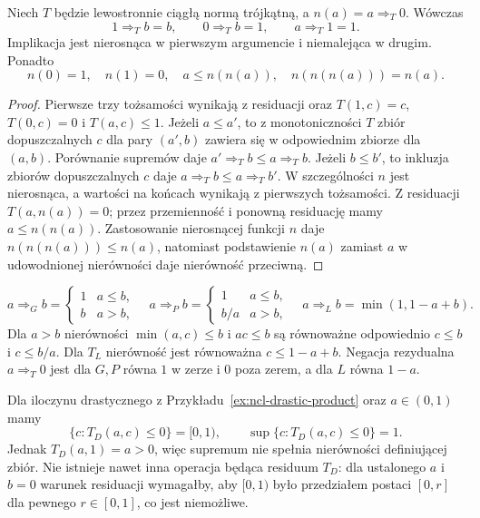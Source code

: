 \begin{lemat}
\label{lem:ncl-residuum-negation}
Niech $T$ będzie lewostronnie ciągłą normą trójkątną,
a $n(a)=a\Rightarrow_T0$. Wówczas
\[
 1\Rightarrow_T b=b,\qquad
 0\Rightarrow_T b=1,\qquad
 a\Rightarrow_T1=1.
\]
Implikacja jest nierosnąca w pierwszym argumencie
i niemalejąca w drugim. Ponadto
\[
 n(0)=1,\quad n(1)=0,\quad a\leq n(n(a)),
 \quad n(n(n(a)))=n(a).
\]
\end{lemat}
\begin{proof}
Pierwsze trzy tożsamości wynikają z residuacji oraz
$T(1,c)=c$, $T(0,c)=0$ i $T(a,c)\leq1$.
Jeżeli $a\leq a'$, to z monotoniczności $T$
zbiór dopuszczalnych $c$ dla pary $(a',b)$
zawiera się w odpowiednim zbiorze dla $(a,b)$.
Porównanie supremów daje $a'\Rightarrow_T b\leq a\Rightarrow_T b$.
Jeżeli $b\leq b'$, to inkluzja zbiorów dopuszczalnych
$c$ daje $a\Rightarrow_T b\leq a\Rightarrow_T b'$.
W szczególności $n$ jest nierosnąca, a wartości na końcach
wynikają z pierwszych tożsamości.
Z residuacji $T(a,n(a))=0$; przez przemienność i ponowną
residuację mamy $a\leq n(n(a))$. Zastosowanie nierosnącej
funkcji $n$ daje $n(n(n(a)))\leq n(a)$, natomiast
podstawienie $n(a)$ zamiast $a$ w udowodnionej nierówności
daje nierówność przeciwną.
\end{proof}

\begin{przyklad}\label{ex:lst-fuzzy-implications}
\[
a\Rightarrow_G b=\begin{cases}1&a\leq b,\\b&a>b,\end{cases}
\quad
a\Rightarrow_P b=\begin{cases}1&a\leq b,\\b/a&a>b,\end{cases}
\quad
a\Rightarrow_L b=\min(1,1-a+b).
\]
Dla $a>b$ nierówności $\min(a,c)\leq b$ i $ac\leq b$ są
równoważne odpowiednio $c\leq b$ i $c\leq b/a$.
Dla $T_L$ nierówność jest równoważna $c\leq1-a+b$.
Negacja rezydualna $a\Rightarrow_T0$ jest dla $G,P$ równa $1$
w zerze i $0$ poza zerem, a dla $L$ równa $1-a$.
\end{przyklad}

\begin{przyklad}
\label{ex:ncl-residuation-failure}
Dla iloczynu drastycznego z Przykładu~\ref{ex:ncl-drastic-product}
oraz $a\in(0,1)$ mamy
\[
 \{c:T_D(a,c)\leq0\}=[0,1),\qquad
 \sup\{c:T_D(a,c)\leq0\}=1.
\]
Jednak $T_D(a,1)=a>0$, więc supremum nie spełnia
nierówności definiującej zbiór. Nie istnieje nawet inna
operacja będąca residuum $T_D$: dla ustalonego $a$ i
$b=0$ warunek residuacji wymagałby, aby $[0,1)$ było
przedziałem postaci $[0,r]$ dla pewnego $r\in[0,1]$,
co jest niemożliwe.
\end{przyklad}

